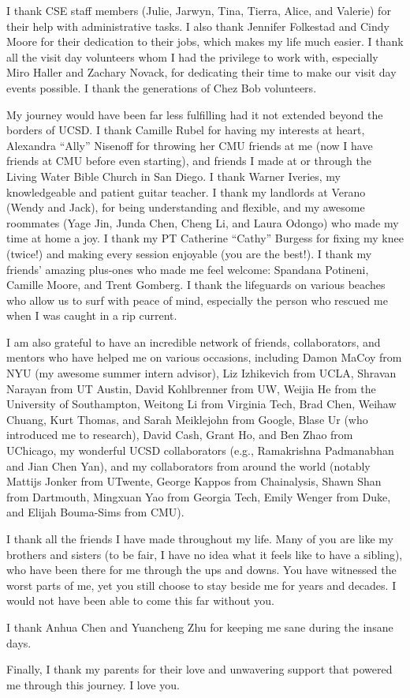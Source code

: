 \begin{acknowledgements}
I thank CSE staff members (Julie, Jarwyn, Tina, Tierra, Alice, and Valerie) for their help with administrative tasks. I also thank Jennifer Folkestad and Cindy Moore for their dedication to their jobs, which makes my life much easier. I thank all the visit day volunteers whom I had the privilege to work with, especially Miro Haller and Zachary Novack, for dedicating their time to make our visit day events possible. I thank the generations of Chez Bob volunteers.

My journey would have been far less fulfilling had it not extended beyond the borders of UCSD. I thank Camille Rubel for having my interests at heart, Alexandra ``Ally'' Nisenoff for throwing her CMU friends at me (now I have friends at CMU before even starting), and friends I made at or through the Living Water Bible Church in San Diego. I thank Warner Iveries, my knowledgeable and patient guitar teacher. I thank my landlords at Verano (Wendy and Jack), for being understanding and flexible, and my awesome roommates (Yage Jin, Junda Chen, Cheng Li, and Laura Odongo) who made my time at home a joy. I thank my PT Catherine ``Cathy'' Burgess for fixing my knee (twice!) and making every session enjoyable (you are the best!). I thank my friends' amazing plus-ones who made me feel welcome: Spandana Potineni, Camille Moore, and Trent Gomberg.
I thank the lifeguards on various beaches who allow us to surf with peace of mind, especially the person who rescued me when I was caught in a rip current. 


I am also grateful to have an incredible network of friends, collaborators, and mentors who have helped me on various occasions, including Damon MaCoy from NYU (my awesome summer intern advisor), Liz Izhikevich from UCLA, Shravan Narayan from UT Austin, David Kohlbrenner from UW, Weijia He from the University of Southampton, Weitong Li from Virginia Tech, Brad Chen, Weihaw Chuang, Kurt Thomas, and Sarah Meiklejohn from Google, Blase Ur (who introduced me to research), David Cash, Grant Ho, and Ben Zhao from UChicago, my wonderful UCSD collaborators (e.g., Ramakrishna Padmanabhan and Jian Chen Yan), and my collaborators from around the world (notably Mattijs Jonker from UTwente, George Kappos from Chainalysis, Shawn Shan from Dartmouth, Mingxuan Yao from Georgia Tech, Emily Wenger from Duke, and Elijah Bouma-Sims from CMU).

I thank all the friends I have made throughout my life. Many of you are like my brothers and sisters (to be fair, I have no idea what it feels like to have a sibling), who have been there for me through the ups and downs. You have witnessed the worst parts of me, yet you still choose to stay beside me for years and decades. I would not have been able to come this far without you.

I thank Anhua Chen and Yuancheng Zhu for keeping me sane during the insane days.

Finally, I thank my parents for their love and unwavering support that powered me through this journey. I love you.



\end{acknowledgements}